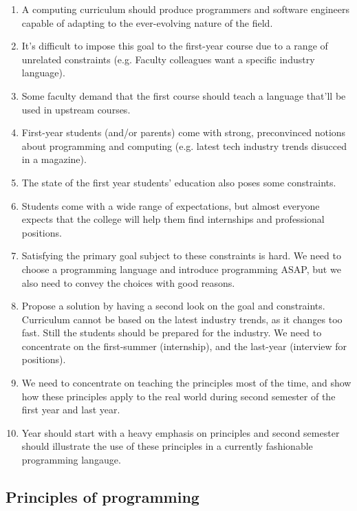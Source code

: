 \documentclass{article}
\begin{document}
\begin{enumerate}
\item A computing curriculum should produce programmers and software
  engineers capable of adapting to the ever-evolving nature of the
  field.
\item It's difficult to impose this goal to the first-year course due
  to a range of unrelated constraints (e.g. Faculty colleagues want a
  specific industry language).
\item Some faculty demand that the first course should teach a
  language that'll be used in upstream courses.
\item First-year students (and/or parents) come with strong,
  preconvinced notions about programming and computing (e.g. latest
  tech industry trends disucced in a magazine).
\item The state of the first year students' education also poses some
  constraints.
\item Students come with a wide range of expectations, but almost
  everyone expects that the college will help them find internships
  and professional positions.
\item Satisfying the primary goal subject to these constraints is
  hard. We need to choose a programming language and introduce
  programming ASAP, but we also need to convey the choices with good
  reasons.
\item Propose a solution by having a second look on the goal and
  constraints. Curriculum cannot be based on the latest industry
  trends, as it changes too fast. Still the students should be
  prepared for the industry. We need to concentrate on the
  first-summer (internship), and the last-year (interview for
  positions).
\item We need to concentrate on teaching the principles most of the
  time, and show how these principles apply to the real world during
  second semester of the first year and last year.
\item Year should start with a heavy emphasis on principles and second
  semester should illustrate the use of these principles in a
  currently fashionable programming langauge.
\end{enumerate}

\subsection{Principles of programming}
\end{document}
